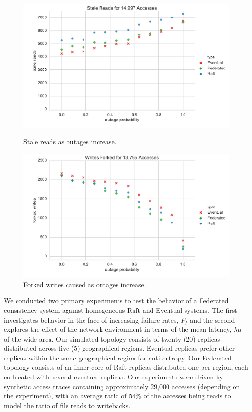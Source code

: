 \documentclass[10pt,conference,letterpaper]{IEEEtran}
\begin{document}
\begin{figure}[t]
    \centering
      \includegraphics[width=\linewidth]{figures/outages/stale_reads}
      \caption{Stale reads as outages increase.}\label{fig:outages_stale_reads}
    \endminipage
      \includegraphics[width=\linewidth]{figures/outages/forked_writes}
      \caption{Forked writes caused as outages increase.}\label{fig:outages_forked_writes}
    \endminipage\hfill
\end{figure}

We conducted two primary experiments to test the behavior of a Federated consistency
system against homogeneous Raft and Eventual systems.
The first investigates behavior in the face of increasing failure rates, $P_f$ and the
second explores the effect of the network environment in terms of the mean latency,
$\lambda{\mu}$ of the wide area.
Our simulated topology consists of twenty (20) replicas distributed across five (5)
geographical regions.
Eventual replicas prefer other replicas within the same geographical region for
anti-entropy.
Our Federated topology consists of an inner core of Raft replicas distributed one per region,
each co-located with several eventual replicas.
Our experiments were driven by synthetic access traces containing approximately 29,000
accesses (depending on the experiment), with an average ratio of 54\% of the accesses
being reads to model the ratio of file reads to writebacks.
\end{document}
